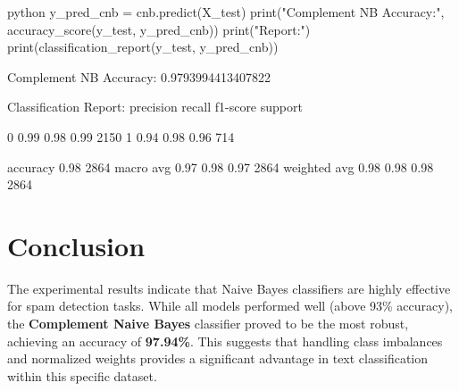 \documentclass[12pt]{article}
\begin{document}
\begin{jupytercode}{python}
y_pred_cnb = cnb.predict(X_test)
print("Complement NB Accuracy:", accuracy_score(y_test, y_pred_cnb))
print("\nClassification Report:")
print(classification_report(y_test, y_pred_cnb))
\end{jupytercode}

\begin{jupyteroutput}
Complement NB Accuracy: 0.9793994413407822

Classification Report:
              precision    recall  f1-score   support

           0       0.99      0.98      0.99      2150
           1       0.94      0.98      0.96       714

    accuracy                           0.98      2864
   macro avg       0.97      0.98      0.97      2864
weighted avg       0.98      0.98      0.98      2864
\end{jupyteroutput}

\section{Conclusion}
The experimental results indicate that Naive Bayes classifiers are highly effective for spam detection tasks. While all models performed well (above 93\% accuracy), the \textbf{Complement Naive Bayes} classifier proved to be the most robust, achieving an accuracy of \textbf{97.94\%}. This suggests that handling class imbalances and normalized weights provides a significant advantage in text classification within this specific dataset.
\end{document}
